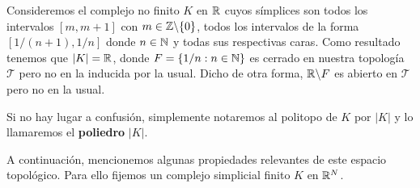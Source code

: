 \begin{ejemplo}
	Consideremos el complejo no finito $K$ en $\mathbb{R}$ cuyos símplices son todos los intervalos
	$[m,m+1]$ con $m \in \mathbb{Z} \backslash \{0\}$, todos los intervalos de la forma
	$[1/( n+1), 1/n]$ donde $n \in \mathbb{N}$ y todas sus respectivas caras. Como resultado
	tenemos que $|K| = \mathbb{R}$, donde $F = \{1/n : n \in \mathbb{N}\}$ es cerrado en nuestra
	topología $\mathcal{T}$ pero no en la inducida por la usual. Dicho de otra forma,
	$\mathbb{R} \backslash F$ es abierto en $\mathcal{T}$ pero no en la usual.
\end{ejemplo}

Si no hay lugar a confusión, simplemente notaremos al politopo de $K$ por $|K|$ y
lo llamaremos el \textbf{poliedro} $|K|$.

A continuación, mencionemos algunas propiedades relevantes de este espacio topológico.
Para ello fijemos un complejo simplicial finito $K$ en $\mathbb{R}^{N}$.


